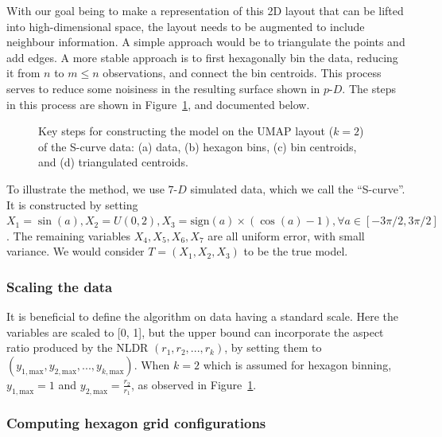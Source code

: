 \documentclass[
  12pt]{article}
\newcommand\pD{$p\text{-}D$}
\begin{document}
With our goal being to make a representation of this 2D layout that can
be lifted into high-dimensional space, the layout needs to be augmented
to include neighbour information. A simple approach would be to
triangulate the points and add edges. A more stable approach is to first
hexagonally bin the data, reducing it from \(n\) to \(m\leq n\)
observations, and connect the bin centroids. This process serves to
reduce some noisiness in the resulting surface shown in \pD{}. The steps
in this process are shown in Figure~\ref{fig-NLDR-scurve}, and
documented below.

\begin{figure}


\caption{\label{fig-NLDR-scurve}Key steps for constructing the model on
the UMAP layout (\(k=2\)) of the S-curve data: (a) data, (b) hexagon
bins, (c) bin centroids, and (d) triangulated centroids.}

\end{figure}%

To illustrate the method, we use \(7\text{-}D\) simulated data, which we
call the ``S-curve''. It is constructed by setting
\(X_1 = \sin(a), X_2 = U(0, 2), X_3 = \text{sign}(a) \times (\cos(a) - 1), \forall a \in [-3\pi/2, 3\pi/2]\).
The remaining variables \(X_4, X_5, X_6, X_7\) are all uniform error,
with small variance. We would consider \(T=(X_1, X_2, X_3)\) to be the
true model.

\subsubsection{Scaling the data}\label{scaling-the-data}

It is beneficial to define the algorithm on data having a standard
scale. Here the variables are scaled to {[}0, 1{]}, but the upper bound
can incorporate the aspect ratio produced by the NLDR
\((r_1, r_2, ..., r_k)\), by setting them to
\((y_{1,\text{max}}, y_{2,\text{max}}, ..., y_{k,\text{max}})\). When
\(k=2\) which is assumed for hexagon binning, \(y_{1,\text{max}}=1\) and
\(y_{2,\text{max}} = \frac{r_2}{r_1}\), as observed in
Figure~\ref{fig-NLDR-scurve}.

\subsubsection{Computing hexagon grid
configurations}\label{computing-hexagon-grid-configurations}
\end{document}
